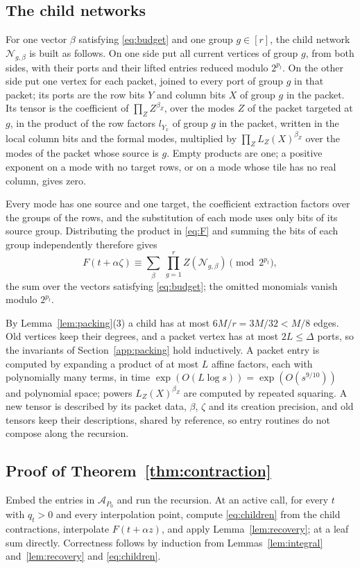 \documentclass[11pt,reqno]{amsart}
\numberwithin{equation}{section}
\theoremstyle{plain}
\theoremstyle{definition}
\theoremstyle{remark}
\newcommand{\cA}{\mathcal{A}}
\newcommand{\cN}{\mathcal{N}}
\begin{document}
\subsection{The child networks}\label{app:children}
For one vector $\beta$ satisfying \eqref{eq:budget} and one group $g\in[r]$, the
child network $\cN_{g,\beta}$ is built as follows. On one side put all current
vertices of group $g$, from both sides, with their ports and their lifted
entries reduced modulo $2^{p_t}$. On the other side put one vertex for each
packet, joined to every port of group $g$ in that packet; its ports are the row
bits $Y$ and column bits $X$ of group $g$ in the packet. Its tensor is the
coefficient of $\prod_ZZ^{\beta_Z}$, over the modes $Z$ of the packet targeted at
$g$, in the product of the row factors $l_{Y_x}$ of group $g$ in the packet,
written in the local column bits and the formal modes, multiplied by
$\prod_ZL_Z(X)^{\beta_Z}$ over the modes of the packet whose source is $g$. Empty
products are one; a positive exponent on a mode with no target rows, or on a
mode whose tile has no real column, gives zero.

Every mode has one source and one target, the coefficient extraction factors
over the groups of the rows, and the substitution of each mode uses only bits of
its source group. Distributing the product in \eqref{eq:F} and summing the bits
of each group independently therefore gives
\begin{equation}\label{eq:children}
F(t+\alpha\zeta)\equiv\sum_{\beta}\ \prod_{g=1}^rZ(\cN_{g,\beta})\pmod{2^{p_t}},
\end{equation}
the sum over the vectors satisfying \eqref{eq:budget}; the omitted monomials
vanish modulo $2^{p_t}$.

By Lemma~\ref{lem:packing}(3) a child has at most $6M/r=3M/32<M/8$ edges. Old
vertices keep their degrees, and a packet vertex has at most $2L\le\Delta$ ports,
so the invariants of Section~\ref{app:packing} hold inductively. A packet entry
is computed by expanding a product of at most $L$ affine factors, each with
polynomially many terms, in time $\exp(O(L\log s))=\exp(O(s^{9/10}))$ and
polynomial space; powers $L_Z(X)^{\beta_Z}$ are computed by repeated squaring. A
new tensor is described by its packet data, $\beta$, $\zeta$ and its creation
precision, and old tensors keep their descriptions, shared by reference, so
entry routines do not compose along the recursion.

\subsection{Proof of Theorem~\ref{thm:contraction}}\label{app:proof}
Embed the entries in $\cA_{P_0}$ and run the recursion. At an active call, for
every $t$ with $q_t>0$ and every interpolation point, compute
\eqref{eq:children} from the child contractions, interpolate $F(t+\alpha z)$,
and apply Lemma~\ref{lem:recovery}; at a leaf sum directly. Correctness follows
by induction from Lemmas~\ref{lem:integral} and~\ref{lem:recovery} and
\eqref{eq:children}.
\end{document}
